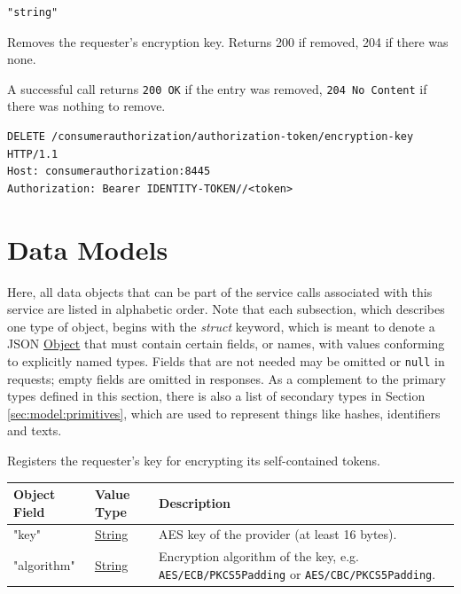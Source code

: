 \documentclass[a4paper]{arrowhead}
\newcommand{\oref}[1]{{\textcolor{ArrowheadBlue}{\hyperref[sec:operations:#1]{#1}}}}
\newcommand{\pref}[1]{{\textcolor{ArrowheadGrey}{\hyperref[sec:model:primitives:#1]{#1}}}}
\begin{document}
\begin{lstlisting}[label={lst:register-encryption-key-resp},caption={An \oref{register-encryption-key} response.}]
"string"
\end{lstlisting}


Removes the requester's encryption key. Returns 200 if removed, 204 if there was none.

A successful call returns \texttt{200 OK} if the entry was removed, \texttt{204 No Content} if there was nothing to remove.

\begin{lstlisting}[label={lst:unregister-encryption-key},caption={An \oref{unregister-encryption-key} invocation.}]
DELETE /consumerauthorization/authorization-token/encryption-key HTTP/1.1
Host: consumerauthorization:8445
Authorization: Bearer IDENTITY-TOKEN//<token>
\end{lstlisting}

\newpage

\section{Data Models}
\label{sec:model}

Here, all data objects that can be part of the service calls associated with this service are listed in alphabetic order.
Note that each subsection, which describes one type of object, begins with the \textit{struct} keyword, which is meant to denote a JSON \pref{Object} that must contain certain fields, or names, with values conforming to explicitly named types.
Fields that are not needed may be omitted or \texttt{null} in requests; empty fields are omitted in responses.
As a complement to the primary types defined in this section, there is also a list of secondary types in Section \ref{sec:model:primitives}, which are used to represent things like hashes, identifiers and texts.


Registers the requester's key for encrypting its self-contained tokens.


\noindent\begin{tabularx}{\textwidth}{| >{\raggedright\arraybackslash}p{3.9cm} | >{\raggedright\arraybackslash\small}p{5.3cm} | X |} \hline
\rowcolor{gray!33} Object Field & Value Type & Description \\ \hline
"key" & \pref{String} & AES key of the provider (at least 16 bytes). \\ \hline
"algorithm" & \pref{String} & Encryption algorithm of the key, e.g. \texttt{AES/\allowbreak{}ECB/\allowbreak{}PKCS5Padding} or \texttt{AES/\allowbreak{}CBC/\allowbreak{}PKCS5Padding}. \\ \hline
\end{tabularx}
\end{document}
